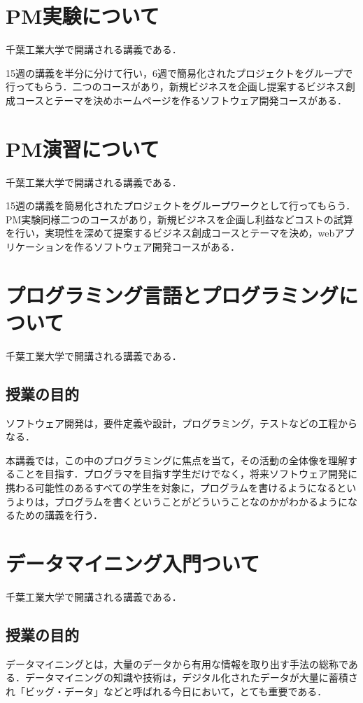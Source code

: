 \newpage
\section{PM実験について}
千葉工業大学で開講される講義である．

15週の講義を半分に分けて行い，6週で簡易化されたプロジェクトをグループで行ってもらう．二つのコースがあり，新規ビジネスを企画し提案するビジネス創成コースとテーマを決めホームページを作るソフトウェア開発コースがある．
\section{PM演習について}
千葉工業大学で開講される講義である．

15週の講義を簡易化されたプロジェクトをグループワークとして行ってもらう．PM実験同様二つのコースがあり，新規ビジネスを企画し利益などコストの試算を行い，実現性を深めて提案するビジネス創成コースとテーマを決め，webアプリケーションを作るソフトウェア開発コースがある．
\newpage
\section{プログラミング言語とプログラミングについて}
千葉工業大学で開講される講義である．
\subsection{授業の目的}

ソフトウェア開発は，要件定義や設計，プログラミング，テストなどの工程からなる．

本講義では，この中のプログラミングに焦点を当て，その活動の全体像を理解することを目指す．プログラマを目指す学生だけでなく，将来ソフトウェア開発に携わる可能性のあるすべての学生を対象に，プログラムを書けるようになるというよりは，プログラムを書くということがどういうことなのかがわかるようになるための講義を行う．

\section{データマイニング入門ついて}
千葉工業大学で開講される講義である．
\subsection{授業の目的}

データマイニングとは，大量のデータから有用な情報を取り出す手法の総称である．データマイニングの知識や技術は，デジタル化されたデータが大量に蓄積され「ビッグ・データ」などと呼ばれる今日において，とても重要である．

